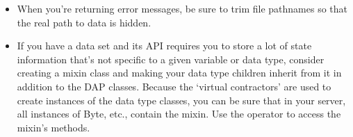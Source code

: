 \documentclass{dods-paper}
\begin{document}
\begin{itemize}
\item When you're returning error messages, be sure to trim file pathnames so
  that the real path to data is hidden.

\item If you have a data set and its API requires you to store a lot of state
  information that's not specific to a given variable or data type, consider
  creating a mixin class and making your data type children inherit from it in
  addition to the DAP classes. Because the `virtual contractors' are used to
  create instances of the data type classes, you can be sure that in your
  server, all instances of Byte, etc., contain the mixin. Use the
   operator to access the mixin's methods.

\end{itemize}



   
\end{document}
